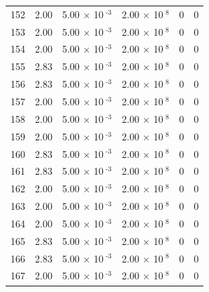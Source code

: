 \documentclass[a4paper,11pt]{article}
\begin{document}
\begin{center}
\begin{longtable}{|R{1.5cm}|R{2.4cm}|R{2.4cm}|R{2.4cm}|R{2.4cm}|R{2.4cm}|}
  152 &   2.00  &         5.00 $\times$ 10$^{\text{          -3}}$  &         2.00 $\times$ 10$^{\text{           8}}$  & 0  & 0 \\
  153 &   2.00  &         5.00 $\times$ 10$^{\text{          -3}}$  &         2.00 $\times$ 10$^{\text{           8}}$  & 0  & 0 \\
  154 &   2.00  &         5.00 $\times$ 10$^{\text{          -3}}$  &         2.00 $\times$ 10$^{\text{           8}}$  & 0  & 0 \\
  155 &   2.83  &         5.00 $\times$ 10$^{\text{          -3}}$  &         2.00 $\times$ 10$^{\text{           8}}$  & 0  & 0 \\
  156 &   2.83  &         5.00 $\times$ 10$^{\text{          -3}}$  &         2.00 $\times$ 10$^{\text{           8}}$  & 0  & 0 \\
  157 &   2.00  &         5.00 $\times$ 10$^{\text{          -3}}$  &         2.00 $\times$ 10$^{\text{           8}}$  & 0  & 0 \\
  158 &   2.00  &         5.00 $\times$ 10$^{\text{          -3}}$  &         2.00 $\times$ 10$^{\text{           8}}$  & 0  & 0 \\
  159 &   2.00  &         5.00 $\times$ 10$^{\text{          -3}}$  &         2.00 $\times$ 10$^{\text{           8}}$  & 0  & 0 \\
  160 &   2.83  &         5.00 $\times$ 10$^{\text{          -3}}$  &         2.00 $\times$ 10$^{\text{           8}}$  & 0  & 0 \\
  161 &   2.83  &         5.00 $\times$ 10$^{\text{          -3}}$  &         2.00 $\times$ 10$^{\text{           8}}$  & 0  & 0 \\
  162 &   2.00  &         5.00 $\times$ 10$^{\text{          -3}}$  &         2.00 $\times$ 10$^{\text{           8}}$  & 0  & 0 \\
  163 &   2.00  &         5.00 $\times$ 10$^{\text{          -3}}$  &         2.00 $\times$ 10$^{\text{           8}}$  & 0  & 0 \\
  164 &   2.00  &         5.00 $\times$ 10$^{\text{          -3}}$  &         2.00 $\times$ 10$^{\text{           8}}$  & 0  & 0 \\
  165 &   2.83  &         5.00 $\times$ 10$^{\text{          -3}}$  &         2.00 $\times$ 10$^{\text{           8}}$  & 0  & 0 \\
  166 &   2.83  &         5.00 $\times$ 10$^{\text{          -3}}$  &         2.00 $\times$ 10$^{\text{           8}}$  & 0  & 0 \\
  167 &   2.00  &         5.00 $\times$ 10$^{\text{          -3}}$  &         2.00 $\times$ 10$^{\text{           8}}$  & 0  & 0 \\

\end{longtable}
\end{center}
\end{document}
